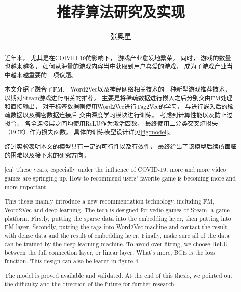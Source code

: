 \documentclass{hainanuthesis}
\title{推荐算法研究及实现}
\author{张奥星}
\begin{document}
\makecover{}

\begin{abstract}
    近年来，
    尤其是在COIVID-19的影响下，
    游戏产业愈发地繁荣。
    同时，
    游戏的数量也越来越多，
    如何从海量的游戏内容当中获取到用户喜爱的游戏，
    成为了游戏产业当中越来越重要的一项议题。

    本文介绍了融合了FM、
    Word2Vec以及神经网络相关技术的一种新型游戏推荐技术，
    以期对Steam游戏进行相关的推荐。
    主要是将稀疏数据进行嵌入之后分别交由FM处理和直接输出，
    对于标签数据则使用Word2Vec进行Tag2Vec的学习，
    与进行嵌入后的稀疏数据以及稠密数据连接后
    交由深度学习模块进行训练。
    考虑到计算性能以及防止过拟合，
    各全连接层之间均使用ReLU作为激活函数，
    最终使用二分类交叉熵损失（BCE）作为损失函数。
    具体的训练模型设计详见\cref{fig:model}。

    经过实验表明本文的模型具有一定的可行性以及有效性，
    最终给出了该模型后续所面临的困难以及接下来的研究方向。
\end{abstract}

\newpage

\begin{abstract}[en]
    These years,
    especially under the influence of COVID-19,
    more and more video games are springing up.
    How to recommend users' favorite game is becoming
    more and more important.

    This thesis mainly introduce a new recommendation technology,
    including FM, Word2Vec and deep learning.
    The tech is designed for vedio games of Steam,
    a game platform.
    Firstly,
    putting the sparse data into the embedding layer,
    then putting into FM layer.
    Secondly,
    putting the tags into Word2Vec machine and
    contact the result with dense data and
    the result of embedding layer.
    Finally,
    make sure all of the data can be trained by
    the deep learning machine.
    To avoid over-fitting,
    we choose ReLU between the full connection layer,
    or linear layer.
    What's more,
    BCE is the loss function.
    This design can also be learnt in figure 4.

    The model is proved available and validated.
    At the end of this thesis,
    we pointed out the difficulty and
    the direction of the future for further research.
\end{abstract}

\newpage
\tableofcontents
\newpage















\begin{acknowledge}
\end{acknowledge}

\printbib{}
\end{document}
